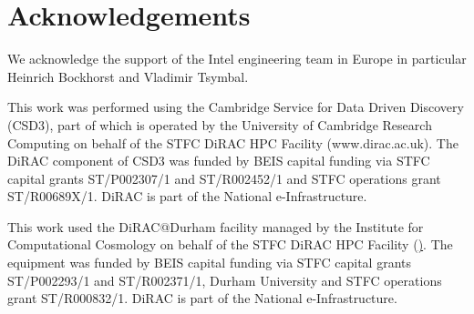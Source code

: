 
\section{Acknowledgements}\label{sec:acknowledgments}
We acknowledge the support of the Intel engineering team in Europe in particular Heinrich Bockhorst and Vladimir Tsymbal.

This work was performed using the Cambridge Service for Data Driven Discovery (CSD3), part of which is operated by the University of Cambridge Research Computing on behalf of the STFC DiRAC HPC Facility (www.dirac.ac.uk).
The DiRAC component of CSD3 was funded by BEIS capital funding via STFC capital grants ST/P002307/1 and ST/R002452/1 and STFC operations grant ST/R00689X/1.
DiRAC is part of the National e-Infrastructure.

This work used the DiRAC@Durham facility managed by the Institute for Computational Cosmology on behalf of the STFC DiRAC HPC Facility (\href{https://www.dirac.ac.uk/}).
The equipment was funded by BEIS capital funding via STFC capital grants ST/P002293/1 and ST/R002371/1, Durham University and STFC operations grant ST/R000832/1.
DiRAC is part of the National e-Infrastructure.
